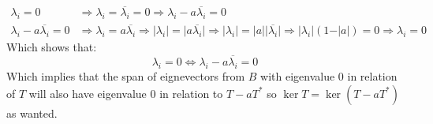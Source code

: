 \documentclass[11pt, a4paper]{article}
\begin{document}
\begin{solution}
\begin{enumerate}
  \begin{align*}
    \lambda_i = 0 &\Rightarrow \lambda_i = \overline{\lambda_i} = 0 
    \Rightarrow \lambda_i - a \overline{\lambda_i} = 0 \\
    \lambda_i - a \overline{\lambda_i} = 0 &\Rightarrow
    \lambda_i = a \overline{\lambda_i} \Rightarrow
    \vert \lambda_i \vert = \vert a \overline{\lambda_i} \vert \Rightarrow
    \vert \lambda_i \vert = \vert a \vert \vert \overline{\lambda_i} \vert
    \Rightarrow \vert \lambda_i \vert (1-\vert a \vert) = 0 \Rightarrow
    \lambda_i = 0
  \end{align*}
  Which shows that:
  \[
    \lambda_i = 0 \iff \lambda_i - a \overline{\lambda_i} = 0
  \]
  Which implies that the span of eignevectors from $B$ with eigenvalue
  $0$ in relation of $T$ will also have eigenvalue $0$ in relation to
  $T - aT^{*}$ so $\ker T = \ker(T - aT^{*})$ as wanted.
  \end{enumerate}
\end{solution}
\end{document}
